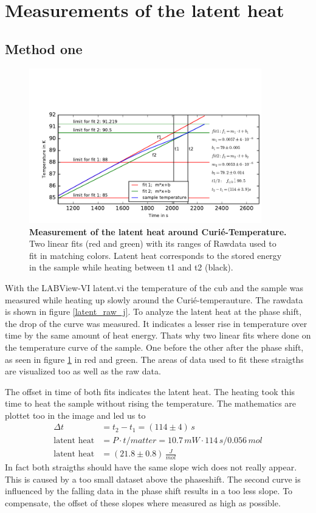 \documentclass{include/thesisclass3}
\newcommand{\e}[1]{\,\si{#1}}
\begin{document}
\section{Measurements of the latent heat}
\subsection{Method one}
\begin{figure}[H]
\includegraphics[width = 0.9\textwidth]{fig/latent_j.pdf}
\caption{\label{latent_j}\textbf{Measurement of the latent heat around Curié-Temperature.} Two linear fits (red and green) with its ranges of Rawdata used to fit in matching colors. Latent heat corresponds to the stored energy in the sample while heating between t1 and t2 (black).}
\end{figure}
With the LABView-VI latent.vi the temperature of the cub and the sample was measured while heating up slowly around the Curié-temperauture. The rawdata is shown in figure \ref{latent_raw_j}. To analyze the latent heat at the phase shift, the drop of the curve was measured. It indicates a lesser rise in temperature over time by the same amount of heat energy. Thats why two linear fits where done on the temperature curve of the sample. One before the other after the phase shift, as seen in figure \ref{latent_j} in red and green. The areas of data used to fit these straigths are visualized too as well as the raw data. 

The offset in time of both fits indicates the latent heat. The heating took this time to heat the sample without rising the temperature. The mathematics are plottet too in the image and led us to
\begin{align}
\Delta t &= t_2-t_1=(114\pm 4)\e{s}\\
\textrm{latent heat} &= P \cdot t / matter=10.7\e{mW}\cdot 114\e{s}/0.056\e{mol} \\
\textrm{latent heat} &= (21.8 \pm 0.8)\e{\frac{J}{mol}}
\end{align}
In fact both straigths should have the same slope wich does not really appear. This is caused by a too small dataset above the phaseshift. The second curve is influenced by the falling data in the phase shift results in a too less slope. To compensate, the offset of these slopes where measured as high as possible.
\end{document}
